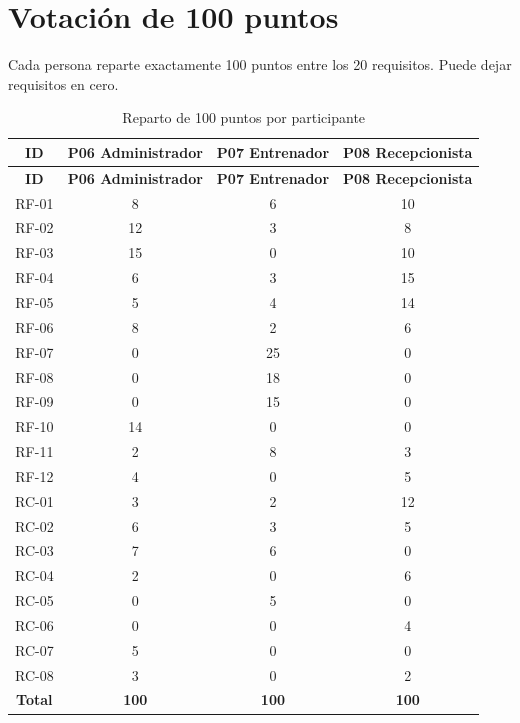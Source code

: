 \section{Votación de 100 puntos}

Cada persona reparte exactamente 100 puntos entre los 20 requisitos. Puede dejar requisitos en cero.

{\footnotesize
\begin{longtable}{@{}cccc@{}}
\caption{Reparto de 100 puntos por participante}\label{tab:votos}\\
\toprule
\textbf{ID} & \textbf{P06 Administrador} & \textbf{P07 Entrenador} & \textbf{P08 Recepcionista}\\
\midrule
\endfirsthead
\toprule
\textbf{ID} & \textbf{P06 Administrador} & \textbf{P07 Entrenador} & \textbf{P08 Recepcionista}\\
\midrule
\endhead
RF-01 & 8 & 6 & 10\\
RF-02 & 12 & 3 & 8\\
RF-03 & 15 & 0 & 10\\
RF-04 & 6 & 3 & 15\\
RF-05 & 5 & 4 & 14\\
RF-06 & 8 & 2 & 6\\
RF-07 & 0 & 25 & 0\\
RF-08 & 0 & 18 & 0\\
RF-09 & 0 & 15 & 0\\
RF-10 & 14 & 0 & 0\\
RF-11 & 2 & 8 & 3\\
RF-12 & 4 & 0 & 5\\
RC-01 & 3 & 2 & 12\\
RC-02 & 6 & 3 & 5\\
RC-03 & 7 & 6 & 0\\
RC-04 & 2 & 0 & 6\\
RC-05 & 0 & 5 & 0\\
RC-06 & 0 & 0 & 4\\
RC-07 & 5 & 0 & 0\\
RC-08 & 3 & 0 & 2\\
\midrule
\textbf{Total} & \textbf{100} & \textbf{100} & \textbf{100}\\
\bottomrule
\end{longtable}
}
